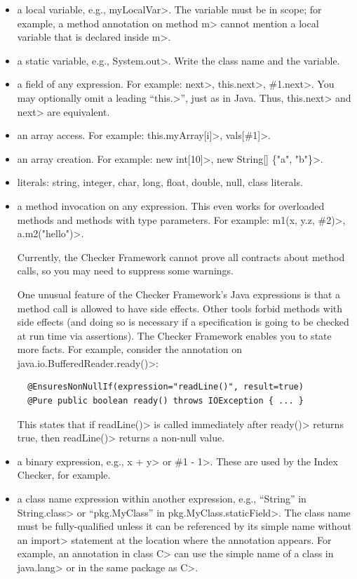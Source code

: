 \begin{itemize}
\item
  a local variable, e.g., \<myLocalVar>.
  The variable must be in scope; for example, a method annotation on method
  \<m> cannot mention a local variable that is declared inside \<m>.

\item
  a static variable, e.g., \<System.out>.
  Write the class name and the variable.

\item
  a field of any expression.  For example:  \<next>,
  \<this.next>, \<\#1.next>. %
  You may optionally omit a leading ``\<this.>'', just as in Java.  Thus,
  \<this.next> and \<next> are equivalent.

\item
  an array access.  For example:  \<this.myArray[i]>, \<vals[\#1]>.

\item
  an array creation. For example: \<new int[10]>, \<new String[] \{"a", "b"\}>.

\item literals: string, integer, char, long, float, double, null, class literals.

\item a method invocation on any expression.
  This even works for overloaded methods and methods with type parameters.
  For example:
  \<m1(x, y.z, \#2)>, \<a.m2("hello")>.

  Currently, the Checker Framework cannot prove all contracts about method
  calls, so you may need to suppress some warnings.

  One unusual feature of the Checker Framework's Java expressions is that a
  method call is allowed to have side effects.  Other tools forbid methods
  with side effects (and doing so is necessary if a specification is going
  to be checked at run time via assertions).  The Checker Framework enables
  you to state more facts.  For example, consider the annotation on
  \<java.io.BufferedReader.ready()>:

\begin{Verbatim}
  @EnsuresNonNullIf(expression="readLine()", result=true)
  @Pure public boolean ready() throws IOException { ... }
\end{Verbatim}

  This states that if \<readLine()> is called immediately after \<ready()>
  returns true, then \<readLine()> returns a non-null value.

\item a binary expression, e.g., \<x + y> or \<\#1 - 1>.  These are used by
  the Index Checker, for example.

\item a class name expression within another expression, e.g., ``String''
  in \<String.class> or ``pkg.MyClass'' in \<pkg.MyClass.staticField>.  The
  class name must be fully-qualified unless it can be referenced by its
  simple name without an \<import> statement at the location where the
  annotation appears.  For example, an annotation in class \<C> can use the
  simple name of a class in \<java.lang> or in the same package as \<C>.

\end{itemize}

